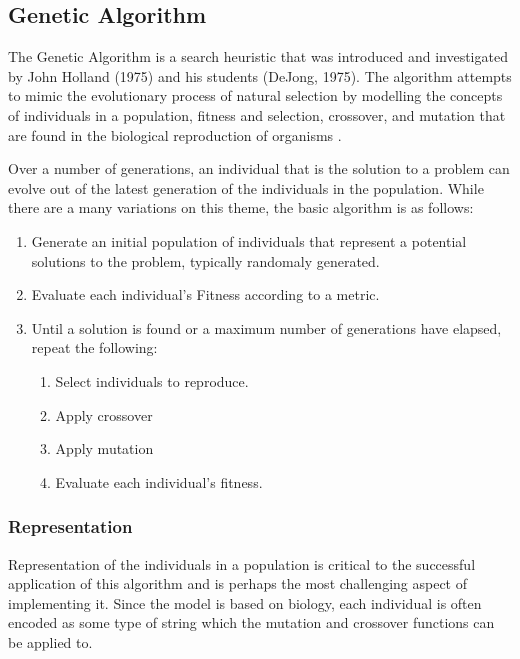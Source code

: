 \newcommand{\tab}{\hspace*{2em}}

\subsection{Genetic Algorithm}
 The Genetic Algorithm is a search heuristic that was introduced and investigated by John Holland (1975) 
and his students (DeJong, 1975). The algorithm attempts to mimic the evolutionary process of natural 
selection \cite{Mitchell1996} by modelling the concepts of individuals in a population, fitness and selection, 
crossover, and mutation that are found in the biological reproduction of organisms \cite{Mitchell1996}. 

Over a number of generations, an individual that is the solution to a problem can 
evolve out of the latest generation of the individuals in the population. While there are a many variations 
on this theme, the basic algorithm is as follows:
\begin{enumerate}
 \item Generate an initial population of individuals that represent a potential solutions to the problem, typically randomaly generated.
 \item Evaluate each individual's Fitness according to a metric.
 \item Until a solution is found or a maximum number of generations have elapsed, repeat the following:
  \begin{enumerate}
   \item Select individuals to reproduce.
   \item Apply crossover
   \item Apply mutation
   \item Evaluate each individual's fitness.
  \end{enumerate}

\end{enumerate}


\subsubsection{Representation}

Representation of the individuals in a population is critical to the successful application of this algorithm and is 
perhaps the most challenging aspect of implementing it. Since the model is based on biology, each individual is often 
encoded as some type of string which the mutation and crossover functions can be applied to. 

